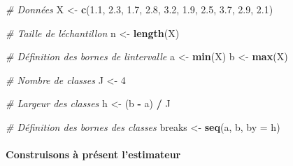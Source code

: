 \documentclass[
  12pt,
]{article}
\newenvironment{Shaded}{\begin{snugshade}}{\end{snugshade}}
\newcommand{\AttributeTok}[1]{\textcolor[rgb]{0.13,0.29,0.53}{#1}}
\newcommand{\CommentTok}[1]{\textcolor[rgb]{0.56,0.35,0.01}{\textit{#1}}}
\newcommand{\DecValTok}[1]{\textcolor[rgb]{0.00,0.00,0.81}{#1}}
\newcommand{\FloatTok}[1]{\textcolor[rgb]{0.00,0.00,0.81}{#1}}
\newcommand{\FunctionTok}[1]{\textcolor[rgb]{0.13,0.29,0.53}{\textbf{#1}}}
\newcommand{\NormalTok}[1]{#1}
\newcommand{\OtherTok}[1]{\textcolor[rgb]{0.56,0.35,0.01}{#1}}
\newcommand{\SpecialCharTok}[1]{\textcolor[rgb]{0.81,0.36,0.00}{\textbf{#1}}}
\begin{document}
\begin{Shaded}
\begin{Highlighting}[]
\CommentTok{\# Données}
\NormalTok{X }\OtherTok{\textless{}{-}} \FunctionTok{c}\NormalTok{(}\FloatTok{1.1}\NormalTok{, }\FloatTok{2.3}\NormalTok{, }\FloatTok{1.7}\NormalTok{, }\FloatTok{2.8}\NormalTok{, }\FloatTok{3.2}\NormalTok{, }\FloatTok{1.9}\NormalTok{, }\FloatTok{2.5}\NormalTok{, }\FloatTok{3.7}\NormalTok{, }\FloatTok{2.9}\NormalTok{, }\FloatTok{2.1}\NormalTok{)}

\CommentTok{\# Taille de l\textquotesingle{}échantillon}
\NormalTok{n }\OtherTok{\textless{}{-}} \FunctionTok{length}\NormalTok{(X)}

\CommentTok{\# Définition des bornes de l\textquotesingle{}intervalle}
\NormalTok{a }\OtherTok{\textless{}{-}} \FunctionTok{min}\NormalTok{(X)}
\NormalTok{b }\OtherTok{\textless{}{-}} \FunctionTok{max}\NormalTok{(X)}

\CommentTok{\# Nombre de classes}
\NormalTok{J }\OtherTok{\textless{}{-}} \DecValTok{4}

\CommentTok{\# Largeur des classes}
\NormalTok{h }\OtherTok{\textless{}{-}}\NormalTok{ (b }\SpecialCharTok{{-}}\NormalTok{ a) }\SpecialCharTok{/}\NormalTok{ J}

\CommentTok{\# Définition des bornes des classes}
\NormalTok{breaks }\OtherTok{\textless{}{-}} \FunctionTok{seq}\NormalTok{(a, b, }\AttributeTok{by =}\NormalTok{ h)}
\end{Highlighting}
\end{Shaded}

\paragraph{Construisons à présent
l'estimateur}\label{construisons-uxe0-pruxe9sent-lestimateur}
\end{document}
